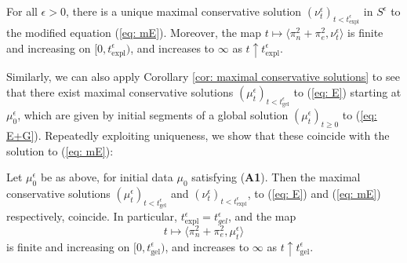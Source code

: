 \begin{lemma}\label{lemma: solution to modified equation}
    For all $\epsilon>0$, there is a unique maximal conservative solution  $(\nu^\epsilon_t)_{t< t_\mathrm{expl}^\epsilon}$ in $S^\epsilon$ to the modified equation (\ref{eq: mE}). Moreover, the map $t\mapsto \langle \pi_n^2+\pi_e^2, \nu^\epsilon_t\rangle$ is finite and increasing on $[0,t_\mathrm{expl}^\epsilon)$, and increases to $\infty$ as $t\uparrow t_\mathrm{expl}^\epsilon$. 
\end{lemma}

Similarly, we can also apply Corollary \ref{cor: maximal conservative solutions} to see that there exist maximal conservative solutions $(\mu^\epsilon_t)_{t<t_\mathrm{gel}^\epsilon}$ to (\ref{eq: E}) starting at $\mu^\epsilon_0$, which are given by initial segments of a global solution $(\mu^\epsilon_t)_{t\geq 0}$ to (\ref{eq: E+G}). Repeatedly exploiting uniqueness, we show that these coincide with the solution to (\ref{eq: mE}):

\begin{lemma}\label{lemma: Relationship}
Let $\mu^\epsilon_0$ be as above, for initial data $\mu_0$ satisfying (\textbf{A1}).  Then the maximal conservative solutions $(\mu^\epsilon_t)_{t<t_\mathrm{gel}^\epsilon}$ and $(\nu^\epsilon_t)_{t<t_\mathrm{expl}^\epsilon}$, to (\ref{eq: E}) and (\ref{eq: mE}) respectively, coincide. In particular, $t_\mathrm{expl}^\epsilon = t^\epsilon_{gel}$, and the map \begin{equation}
    t\mapsto \langle \pi_n^2+\pi_e^2, \mu^\epsilon_t\rangle
\end{equation} is finite and increasing on $[0, t_\mathrm{gel}^\epsilon)$, and increases to $\infty$ as $t\uparrow t_\mathrm{gel}^\epsilon.$ \end{lemma}


